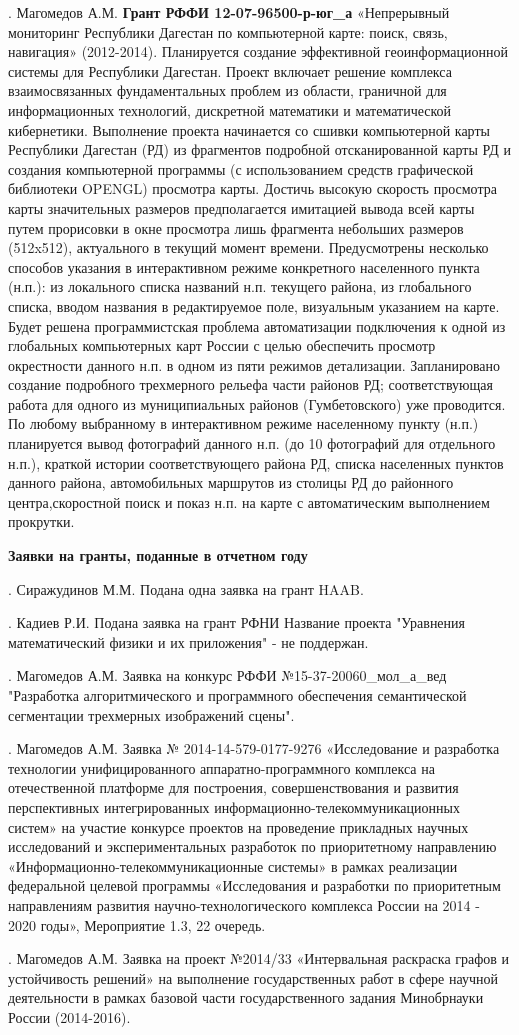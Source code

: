 .  Магомедов А.М. \textbf{Грант РФФИ 12-07-96500-р-юг\_а} «Непрерывный мониторинг Республики Дагестан по компьютерной карте: поиск, связь, навигация» (2012-2014). Планируется создание эффективной геоинформационной системы для Республики Дагестан. Проект включает решение комплекса взаимосвязанных фундаментальных проблем из области, граничной для информационных технологий, дискретной математики и математической кибернетики. Выполнение проекта начинается со сшивки компьютерной карты Республики Дагестан (РД) из фрагментов подробной отсканированной карты РД и создания компьютерной программы (с использованием средств графической библиотеки OPENGL) просмотра карты. Достичь высокую скорость просмотра карты значительных размеров предполагается имитацией вывода всей карты путем прорисовки в окне просмотра лишь фрагмента небольших размеров (512x512), актуального в текущий момент времени. Предусмотрены несколько способов указания в интерактивном режиме конкретного населенного пункта (н.п.): из локального списка названий н.п. текущего района, из глобального списка, вводом названия в редактируемое поле, визуальным указанием на карте. Будет решена программистская проблема автоматизации подключения к одной из глобальных компьютерных карт России с целью обеспечить просмотр окрестности данного н.п. в одном из пяти режимов детализации. Запланировано создание подробного трехмерного рельефа части районов РД; соответствующая работа для одного из муниципиальных районов (Гумбетовского) уже проводится. По любому выбранному в интерактивном режиме населенному пункту (н.п.) планируется вывод фотографий данного н.п. (до 10 фотографий для отдельного н.п.), краткой истории соответствующего района РД, списка населенных пунктов данного района, автомобильных маршрутов из столицы РД до районного центра,скоростной поиск и показ н.п. на карте с автоматическим выполнением прокрутки.

\noindent \textbf{Заявки на гранты, поданные в отчетном году}

.  Сиражудинов М.М. Подана одна заявка на грант HAAB.

.  Кадиев Р.И. Подана заявка на грант  РФНИ Название проекта "Уравнения математический физики и их приложения" - не поддержан.

.  Магомедов А.М. Заявка на конкурс РФФИ №15-37-20060\_мол\_а\_вед "Разработка алгоритмического и программного обеспечения семантической сегментации трехмерных изображений сцены".

.  Магомедов А.М. Заявка № 2014-14-579-0177-9276 «Исследование и разработка технологии унифицированного аппаратно-программного комплекса на отечественной платформе для построения, совершенствования и развития перспективных интегрированных информационно-телекоммуникационных систем» на участие конкурсе проектов на проведение прикладных научных исследований и экспериментальных разработок  по приоритетному направлению «Информационно-телекоммуникационные системы» в рамках реализации федеральной целевой программы «Исследования и разработки по приоритетным направлениям развития научно-технологического комплекса России на 2014 - 2020 годы», Мероприятие 1.3, 22 очередь.

.  Магомедов А.М. Заявка на проект №2014/33 «Интервальная раскраска графов и устойчивость решений» на выполнение государственных работ в сфере научной деятельности в рамках базовой части государственного задания Минобрнауки России (2014-2016).

\noindent